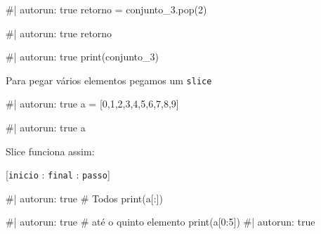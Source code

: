 \documentclass[
  letterpaper,
  DIV=11,
  numbers=noendperiod]{scrreprt}
\newenvironment{Shaded}{\begin{snugshade}}{\end{snugshade}}
\newcommand{\NormalTok}[1]{\textcolor[rgb]{0.00,0.23,0.31}{#1}}
\begin{document}
\begin{Shaded}
\begin{Highlighting}[]
\NormalTok{\#| autorun: true}
\NormalTok{retorno = conjunto\_3.pop(2)}
\end{Highlighting}
\end{Shaded}

\begin{Shaded}
\begin{Highlighting}[]
\NormalTok{\#| autorun: true}
\NormalTok{retorno}
\end{Highlighting}
\end{Shaded}

\begin{Shaded}
\begin{Highlighting}[]
\NormalTok{\#| autorun: true}
\NormalTok{print(conjunto\_3)}
\end{Highlighting}
\end{Shaded}

Para pegar vários elementos pegamos um \texttt{slice}

\begin{Shaded}
\begin{Highlighting}[]
\NormalTok{\#| autorun: true}
\NormalTok{a = [0,1,2,3,4,5,6,7,8,9]}
\end{Highlighting}
\end{Shaded}

\begin{Shaded}
\begin{Highlighting}[]
\NormalTok{\#| autorun: true}
\NormalTok{a}
\end{Highlighting}
\end{Shaded}

Slice funciona assim:

{[}\texttt{inicio} : \texttt{final} : \texttt{passo}{]}

\begin{Shaded}
\begin{Highlighting}[]
\NormalTok{\#| autorun: true}
\NormalTok{\# Todos}
\NormalTok{print(a[:])}
\end{Highlighting}
\end{Shaded}

\begin{Shaded}
\begin{Highlighting}[]
\NormalTok{\#| autorun: true}
\NormalTok{\# até o quinto elemento}
\NormalTok{print(a[0:5])}
\NormalTok{\#| autorun: true}
\end{Highlighting}
\end{Shaded}
\end{document}
